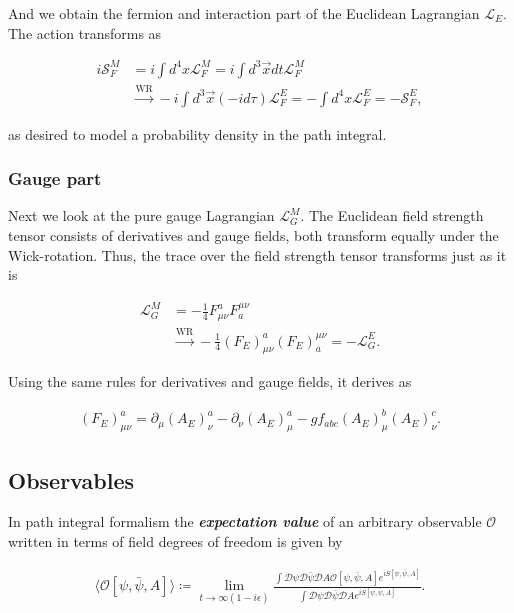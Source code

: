 \documentclass{article}
\theoremstyle{plain} %
\theoremstyle{convention} %
\theoremstyle{remark} %
\def\df#1{\textbf{\textit{#1}}}
\numberwithin{equation}{section}
\begin{document}
And we obtain the fermion and interaction part of the Euclidean Lagrangian $\mathcal{L}_E$. The action transforms as

\begin{align*}
    i \mathcal{S}_{F}^M &= i \int d^4x \mathcal{L}_{F}^M = i \int d^3\vec{x} dt \mathcal{L}_{F}^M \\
    &\stackrel{\text{WR}}{\longrightarrow} - i \int d^3\vec{x} (-i d\tau) \mathcal{L}_{F}^E = - \int d^4x \mathcal{L}_{F}^E = - \mathcal{S}_{F}^E,
\end{align*}

as desired to model a probability density in the path integral.

\subsubsection{Gauge part}

Next we look at the pure gauge Lagrangian $\mathcal{L}_{G}^M$. The Euclidean field strength tensor consists of derivatives and gauge fields, both transform equally under the Wick-rotation. Thus, the trace over the field strength tensor transforms just as it is

\begin{align*}
    \mathcal{L}_G^M &= - \frac{1}{4} F_{\mu \nu}^a F_a^{\mu \nu} \\
    &\stackrel{\text{WR}}{\longrightarrow} - \frac{1}{4} (F_E)_{\mu \nu}^a (F_E)_a^{\mu \nu} = - \mathcal{L}_G^E.
\end{align*}

Using the same rules for derivatives and gauge fields, it derives as

\begin{align*}
    (F_E)_{\mu \nu}^a = \partial_{\mu} (A_E)_{\nu}^a - \partial_{\nu} (A_E)_{\mu}^a - g f_{abc} (A_E)_{\mu}^b (A_E)_{\nu}^c.
\end{align*}

\subsection{Observables}

In path integral formalism the \df{expectation value} of an arbitrary observable $\mathcal{O}$ written in terms of field degrees of freedom is given by

\begin{align}
    \langle \mathcal{O}[\psi, \bar{\psi}, A] \rangle \coloneqq \lim_{t \to \infty(1-i \epsilon)} \frac{ \int \mathcal{D}\psi \mathcal{D} \bar{\psi} \mathcal{D} A \mathcal{O}[\psi, \bar{\psi}, A] e^{iS[\psi, \bar{\psi}, A]} }{ \int \mathcal{D}\psi \mathcal{D} \bar{\psi} \mathcal{D} A e^{iS[\psi, \bar{\psi}, A]} }. \label{eq:expectation_value}
\end{align}
\end{document}
